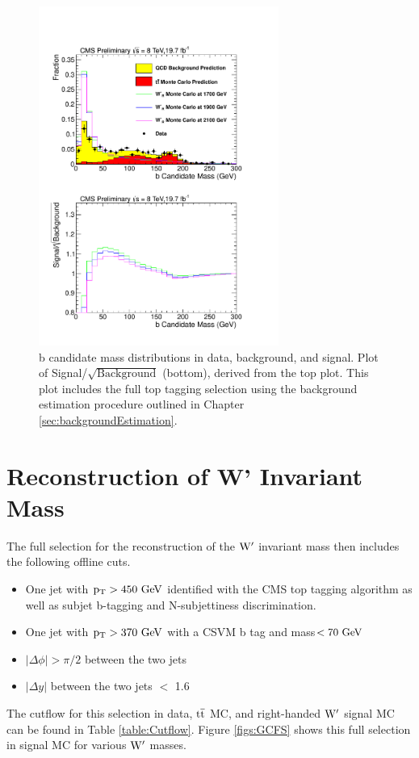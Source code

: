 \begin{figure}[htcb]
\begin{center}
\includegraphics[width=0.7\textwidth]{AN-13-004/figs/bmassdatatosigwithdata.pdf}
\caption{
b candidate mass distributions in data, background, and signal.  Plot of Signal/$\sqrt{\text{Background}}$ (bottom), derived from the top plot. 
This plot includes the full top tagging selection using the background estimation procedure outlined in Chapter \ref{sec:backgroundEstimation}.
}
\label{figs:BmassCOMP}
\end{center}
\end{figure}


\section{Reconstruction of W' Invariant Mass}
\label{sec:fullselection}
The full selection for the reconstruction of the $\mathrm{W}^\prime$ invariant mass then includes the following offline cuts.
\begin{itemize}
\item One jet with $\mathrm{p_{T}} > 450~\mathrm{GeV}$ identified with the CMS top tagging algorithm as well as subjet b-tagging and N-subjettiness discrimination.
\item One jet with $\mathrm{p_{T}} > 370~\mathrm{GeV}$ with a CSVM b tag and mass$ < 70~\mathrm{GeV}$
\item $|\Delta \phi| > \pi/2$ between the two jets
\item $|\Delta y|$ between the two jets $<$ 1.6 
\end{itemize}
The cutflow for this selection in data, $\mathrm{t\overline{t}}$ MC, and right-handed $\mathrm{W}^\prime$ signal MC can be found in Table \ref{table:Cutflow}.
Figure \ref{figs:GCFS} shows this full selection in signal MC for various $\mathrm{W}^\prime$ masses.  



